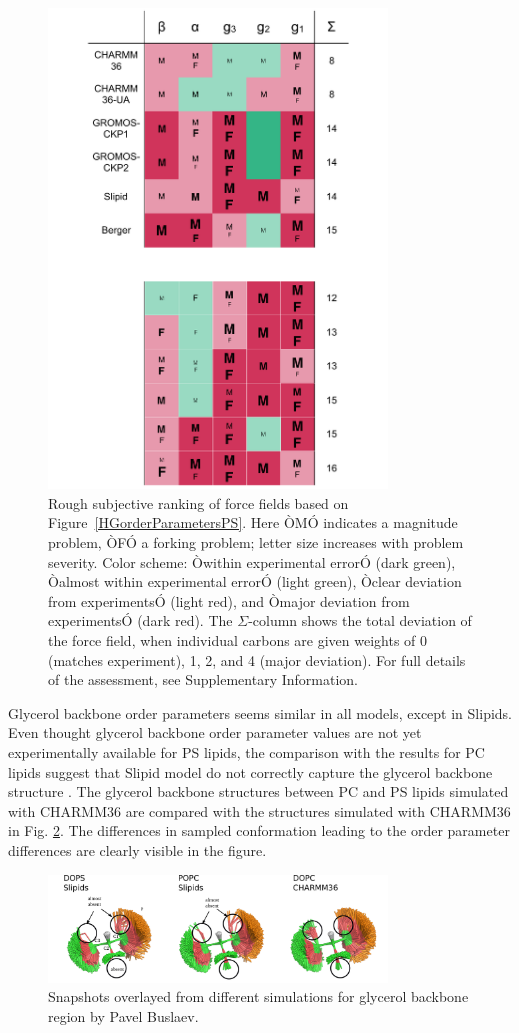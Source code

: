 \documentclass[aps,prl,superscriptaddress,twocolumn]{revtex4}
\begin{document}
\begin{figure}[]
  \centering
  \includegraphics[width=9.0cm]{../Figs/comparisonTablePS.pdf}
  \caption{\label{comparisonTablePS}
  Rough subjective ranking of force fields based on Figure~\ref{HGorderParametersPS}. Here ÒMÓ indicates a magnitude problem, ÒFÓ a forking problem; letter size increases with problem severity. Color scheme: Òwithin experimental errorÓ (dark green), Òalmost within experimental errorÓ (light green), Òclear deviation from experimentsÓ (light red), and Òmajor deviation from experimentsÓ (dark red). The $\Sigma$-column shows the total deviation of the force field, when individual carbons are given weights of 0 (matches experiment), 1, 2, and 4 (major deviation). For full details of the assessment, see Supplementary Information.
  }
\end{figure}

Glycerol backbone order parameters seems similar in all models,
except in Slipids. Even thought glycerol backbone order parameter
values are not yet experimentally available for PS lipids,
the comparison with the results for PC lipids suggest that
Slipid model do not correctly capture the glycerol backbone
structure \cite{botan15}. The glycerol backbone structures between PC and
PS lipids simulated with CHARMM36 are compared with the structures
simulated with CHARMM36 in Fig. \ref{glycerol_buslaev}.
The differences in sampled conformation leading to the order parameter
differences are clearly visible in the figure.
\begin{figure}[]
  \centering
  \includegraphics[width=9.0cm]{../Figs/glycerol_buslaev.png}
  \caption{\label{glycerol_buslaev}
    Snapshots overlayed from different simulations for glycerol backbone region
    by Pavel Buslaev.
  }
\end{figure}
\end{document}
